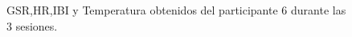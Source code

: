 \begin{figure}[h]
        \centering
        \caption{GSR,HR,IBI y Temperatura obtenidos del participante 6 durante las 3 sesiones.}\label{fig:data_p6}
\end{figure}
\pagebreak

